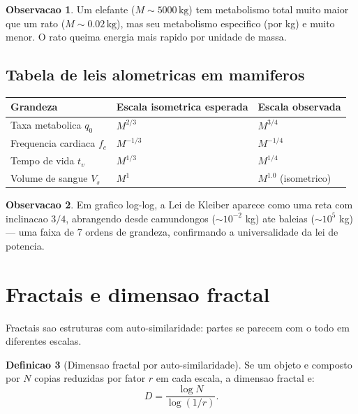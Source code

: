 \documentclass[12pt,a4paper,oneside]{book}
\theoremstyle{definition}
\newtheorem{definition}{Definicao}[chapter]
\newtheorem{remark}[definition]{Observacao}
\begin{document}
\begin{remark}
Um elefante ($M \sim 5000\,\text{kg}$) tem metabolismo total muito maior que um rato
($M \sim 0.02\,\text{kg}$), mas seu metabolismo especifico (por kg) e muito menor.
O rato queima energia mais rapido por unidade de massa.
\end{remark}

\subsection{Tabela de leis alometricas em mamiferos}

\begin{center}
\begin{tabular}{lll}
\toprule
\textbf{Grandeza} & \textbf{Escala isometrica esperada} & \textbf{Escala observada} \\
\midrule
Taxa metabolica $q_0$ & $M^{2/3}$ & $M^{3/4}$ \\
Frequencia cardiaca $f_c$ & $M^{-1/3}$ & $M^{-1/4}$ \\
Tempo de vida $t_v$ & $M^{1/3}$ & $M^{1/4}$ \\
Volume de sangue $V_s$ & $M^{1}$ & $M^{1.0}$ (isometrico) \\
\bottomrule
\end{tabular}
\end{center}

\begin{remark}
Em grafico log-log, a Lei de Kleiber aparece como uma reta com inclinacao $3/4$,
abrangendo desde camundongos ($\sim 10^{-2}$ kg) ate baleias ($\sim 10^5$ kg) ---
uma faixa de 7 ordens de grandeza, confirmando a universalidade da lei de potencia.
\end{remark}

\section{Fractais e dimensao fractal}

Fractais sao estruturas com auto-similaridade: partes se parecem com o todo em diferentes escalas.

\begin{definition}[Dimensao fractal por auto-similaridade]
Se um objeto e composto por $N$ copias reduzidas por fator $r$ em cada escala,
a dimensao fractal e:
\begin{equation}
D = \frac{\log N}{\log(1/r)}.
\end{equation}
\end{definition}
\end{document}
